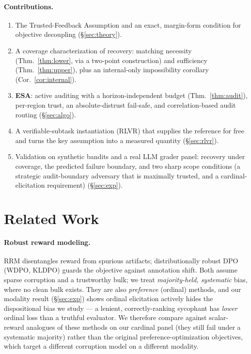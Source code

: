 \documentclass[11pt]{article}
\theoremstyle{definition}\newtheorem{definition}{Definition}
\theoremstyle{definition}\newtheorem{assumption}{Assumption}
\begin{document}
\paragraph{Contributions.}
\begin{enumerate}[nosep,leftmargin=1.4em]
\item The Trusted-Feedback Assumption and an exact, margin-form condition for objective decoupling
(\S\ref{sec:theory}).
\item A coverage characterization of recovery: matching necessity (Thm.~\ref{thm:lower}, via a
two-point construction) and sufficiency (Thm.~\ref{thm:upper}), plus an internal-only impossibility
corollary (Cor.~\ref{cor:internal}).
\item \textbf{ESA}: active auditing with a horizon-independent budget (Thm.~\ref{thm:audit}),
per-region trust, an absolute-distrust fail-safe, and correlation-based audit routing
(\S\ref{sec:algo}).
\item A verifiable-subtask instantiation (RLVR) that supplies the reference for free and turns the
key assumption into a measured quantity (\S\ref{sec:rlvr}).
\item Validation on synthetic bandits and a real LLM grader panel: recovery under coverage, the
predicted failure boundary, and two sharp scope conditions (a strategic audit-boundary adversary that
is maximally trusted, and a cardinal-elicitation requirement) (\S\ref{sec:exp}).
\end{enumerate}

\section{Related Work}\label{sec:related}
\paragraph{Robust reward modeling.} RRM \citep{liu2024rrm} disentangles reward from spurious
artifacts; distributionally robust DPO (WDPO, KLDPO) \citep{xu2025robust} guards the objective
against annotation shift. Both assume sparse corruption and a trustworthy bulk; we treat
\emph{majority-held, systematic} bias, where no clean bulk exists. They are also \emph{preference}
(ordinal) methods, and our modality result (\S\ref{sec:exp}) shows ordinal elicitation actively hides
the dispositional bias we study --- a lenient, correctly-ranking sycophant has \emph{lower} ordinal
loss than a truthful evaluator. We therefore compare against scalar-reward analogues of these methods
on our cardinal panel (they still fail under a systematic majority) rather than the original
preference-optimization objectives, which target a different corruption model on a different modality.
\end{document}
